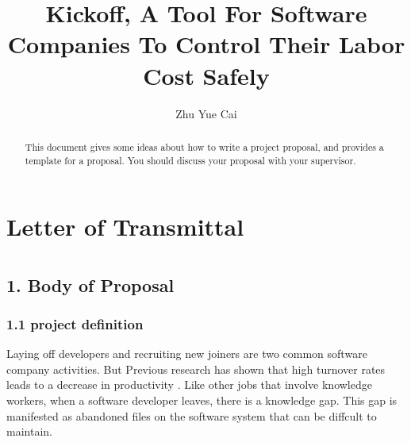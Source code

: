 \documentclass[11pt, a4paper, openright]{report}
\title{Kickoff, A Tool For Software Companies To Control Their Labor Cost Safely}
\author{Zhu Yue Cai}
\date{}
\begin{document}
\frontmatter


\begin{abstract}
	
  This document gives some ideas about how to write a project
  proposal, and provides a template for a proposal. You should discuss
  your proposal with your supervisor.
\end{abstract}


\maketitle
\tableofcontents %
\setcounter{page}{2} %





\mainmatter

\chapter*{Letter of Transmittal}
\setcounter{page}{3}

\chapter*{}
\section* {1. Body of Proposal}

\subsection*{1.1 project definition}
Laying off developers and recruiting new joiners are two common software company activities. But Previous research has shown that high turnover rates leads to a decrease in productivity \cite{Guthrie2001AMJ}. 
Like other jobs that involve knowledge workers, 
when a software developer leaves, there is a knowledge gap. This gap is manifested as abandoned
files on the software system that can be diffcult to maintain.
\end{document}
